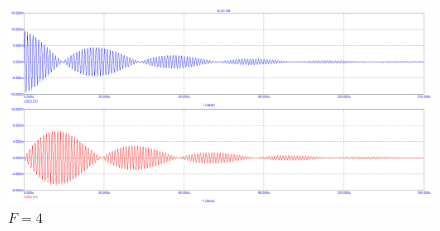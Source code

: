 \documentclass[a4paper, 12pt]{article}%
\begin{document}
\begin{enumerate}
\begin{figure}[h!]
\centering
\includegraphics[scale = 0.4]{images/plot2-3_3.png}
\caption{$F = 4$}
\label{fig:Image1}
\end{figure}

\end{enumerate}
\end{document}
